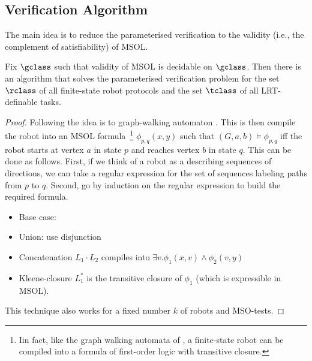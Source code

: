 


\subsection{Verification Algorithm}

The main idea is to reduce the parameterised verification to the validity (i.e.,
the complement of satisfiability) of MSOL.

\begin{theorem}
Fix $\gclass$ such that validity of MSOL is decidable on $\gclass$. Then there
is an algorithm that solves the parameterised verification problem for the set
$\rclass$ of all finite-state robot protocols and the set $\tclass$ of all
LRT-definable tasks.
\end{theorem}

\begin{proof}
Following \cite{BlEn97,EnHo06} the idea is to %
graph-walking automaton \cite{BlEn97}. This is then
compile the robot into an MSOL formula~\footnote{Iin fact, like the graph
walking automata of \cite{BlEn97,EnHo06}, a finite-state robot can be compiled
into a formula of first-order logic with transitive closure.} $\phi_{p,q}(x,y)$
such that $(G,a,b) \models \phi_{p,q}$ iff the robot starts at vertex $a$ in
state $p$ and reaches vertex $b$ in state $q$. This can be done as follows.
First, if we think of a robot as a describing sequences of directions, we can
take a regular expression for the set of sequences labeling paths from $p$ to
$q$. Second, go by induction on the regular expression to build the required
formula.

\begin{itemize}
\item Base case:

\item Union: use disjunction

\item Concatenation $L_1 \cdot L_2$ compiles into $\exists v. \phi_1(x,v) \wedge
\phi_2(v,y)$

\item Kleene-closure $L_1^*$ is the transitive closure of $\phi_1$ (which is
expressible in MSOL).
\end{itemize}

This technique also works for a fixed number $k$ of robots and
MSO-tests.
\end{proof}

